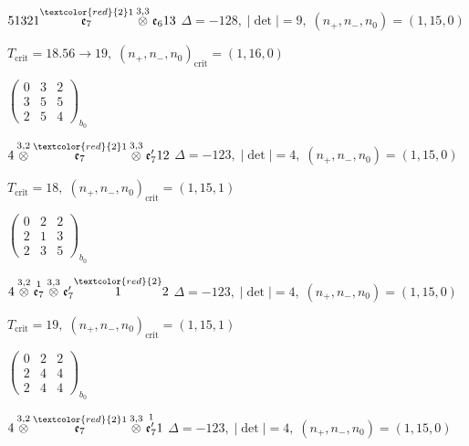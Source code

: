\documentclass[10pt]{article}
\begin{document}
$51321\overset{\textcolor{red}{2}1}{\mathfrak{e}_7}\overset{3,3}{\otimes}\mathfrak{e}_613$ \quad $\Delta=-128,\; |\det|=9,\; (n_+,n_-,n_0)=(1,15,0)$

\hspace{1em}$T_{\text{crit}}=18.56 \to 19,\; (n_+,n_-,n_0)_{\text{crit}}=(1,16,0)$

\hspace{2em}$\left(\begin{smallmatrix}0 & 3 & 2 \\ 3 & 5 & 5 \\ 2 & 5 & 4\end{smallmatrix}\right)_{\!b_0}$

\smallskip

$4\overset{3,2}{\otimes}\overset{\textcolor{red}{2}1}{\mathfrak{e}_7}\overset{3,3}{\otimes}\mathfrak{e}_7'12$ \quad $\Delta=-123,\; |\det|=4,\; (n_+,n_-,n_0)=(1,15,0)$

\hspace{1em}$T_{\text{crit}}=18,\; (n_+,n_-,n_0)_{\text{crit}}=(1,15,1)$

\hspace{2em}$\left(\begin{smallmatrix}0 & 2 & 2 \\ 2 & 1 & 3 \\ 2 & 3 & 5\end{smallmatrix}\right)_{\!b_0}$

$4\overset{3,2}{\otimes}\overset{1}{\mathfrak{e}_7}\overset{3,3}{\otimes}\mathfrak{e}_7'\overset{\textcolor{red}{2}}{1}2$ \quad $\Delta=-123,\; |\det|=4,\; (n_+,n_-,n_0)=(1,15,0)$

\hspace{1em}$T_{\text{crit}}=19,\; (n_+,n_-,n_0)_{\text{crit}}=(1,15,1)$

\hspace{2em}$\left(\begin{smallmatrix}0 & 2 & 2 \\ 2 & 4 & 4 \\ 2 & 4 & 4\end{smallmatrix}\right)_{\!b_0}$

\smallskip

$4\overset{3,2}{\otimes}\overset{\textcolor{red}{2}1}{\mathfrak{e}_7}\overset{3,3}{\otimes}\overset{1}{\mathfrak{e}_7'}1$ \quad $\Delta=-123,\; |\det|=4,\; (n_+,n_-,n_0)=(1,15,0)$
\end{document}
